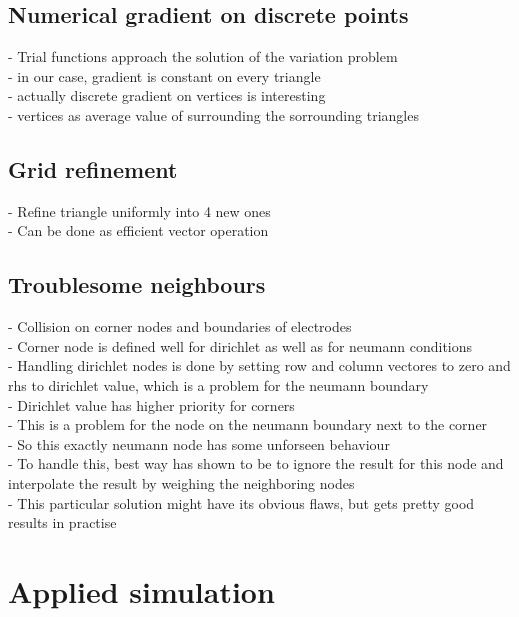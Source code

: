 \documentclass[parskip=half, titlepage=yes, 12pt, BCOR=12mm, DIV=calc]{scrartcl}
\begin{document}
\subsection{Numerical gradient on discrete points}
- Trial functions approach the solution of the variation problem \\
- in our case, gradient is constant on every triangle \\
- actually discrete gradient on vertices is interesting \\
- vertices as average value of surrounding the sorrounding triangles \\

\subsection{Grid refinement}
- Refine triangle uniformly into 4 new ones \\
- Can be done as efficient vector operation \\

\subsection{Troublesome neighbours}
- Collision on corner nodes and boundaries of electrodes \\
- Corner node is defined well for dirichlet as well as for neumann conditions \\
- Handling dirichlet nodes is done by setting row and column vectores to zero and rhs to dirichlet value, which is a problem for the neumann boundary  \\
- Dirichlet value has higher priority for corners \\
- This is a problem for the node on the neumann boundary next to the corner \\
- So this exactly neumann node has some unforseen behaviour \\
- To handle this, best way has shown to be to ignore the result for this node and interpolate the result by weighing the neighboring nodes \\  
- This particular solution might have its obvious flaws, but gets pretty good results in practise \\






\section{Applied simulation}
\end{document}
